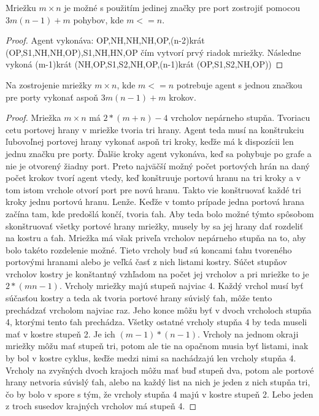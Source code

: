 \begin{lem}
Mriežku $m \times n$ je možné s použitím jedinej značky pre port zostrojiť
pomocou $3m(n - 1) + m$ pohybov, kde $m <= n$.
\end{lem}
\begin{proof}
Agent vykonáva: OP,NH,NH,NH,OP,(n-2)krát (OP,S1,NH,NH,OP),S1,NH,HN,OP čím
vytvorí prvý riadok mriežky. Následne vykoná
(m-1)krát (NH,OP,S1,S2,NH,OP,(n-1)krát (OP,S1,S2,NH,OP))
\end{proof}
\begin{lem}
Na zostrojenie mriežky $m \times n$, kde $m <=  n$ potrebuje agent s jednou
značkou pre porty vykonať aspoň $3m(n - 1) + m$ krokov.
\end{lem}
\begin{proof}
Mriežka $m \times n$ má $2*(m+n) - 4$ vrcholov nepárneho stupňa. Tvoriacu
cetu portovej hrany v mriežke tvoria tri hrany. Agent teda musí na
konštrukciu ľubovoľnej portovej hrany vykonať aspoň tri kroky, keďže má k
dispozícii len jednu značku pre porty.
Ďalšie kroky agent vykonáva, keď sa pohybuje po grafe a nie je otvorený
žiadny port. Preto najväčší možný počet portových hrán na daný počet krokov 
tvorí agent vtedy, keď konštruuje portovú hranu na tri kroky a v tom istom
vrchole otvorí port pre novú hranu. Takto vie konštruovať každé tri kroky
jednu portovú hranu. Lenže. Keďže v tomto prípade jedna portová hrana začína
tam, kde predošlá končí, tvoria ťah. Aby teda bolo možné týmto spôsobom
skonštruovať všetky portové hrany mriežky, musely by sa jej hrany dať 
rozdeliť na kostru a ťah. Mriežka má však priveľa vrcholov nepárneho stupňa
na to, aby bolo takéto rozdelenie možné.
Tieto vrcholy buď sú koncami ťahu tvoreného portovými hranami alebo je veľká
časť z nich 
listami kostry. Súčet stupňov vrcholov kostry je konštantný vzhľadom na
počet jej vrcholov a pri mriežke to je $2 * (mn - 1)$. Vrcholy mriežky majú
stupeň najviac 4. Každý vrchol musí byť súčasťou kostry a teda ak tvoria
portové hrany súvislý ťah, môže tento prechádzať vrcholom najviac raz. Jeho
konce môžu byť v dvoch vrcholoch stupňa 4, ktorými tento ťah prechádza.
Všetky ostatné vrcholy stupňa 4 by teda museli mať v kostre stupeň 2. Je ich $(m -
1) * (n -1)$. Vrcholy na jednom okraji mriežky môžu mať stupeň tri, potom
ale tie na opačnom musia byť listami, inak by bol v kostre cyklus, keďže
medzi nimi sa nachádzajú len vrcholy stupňa 4. Vrcholy na zvyšných dvoch
krajoch môžu mať buď stupeň dva, potom ale portové hrany netvoria súvislý
ťah, alebo na každý list na nich je jeden z nich stupňa tri, čo by bolo v
spore s tým, že vrcholy stupňa 4 majú v kostre stupeň 2. Lebo jeden z troch
susedov krajných vrcholov má stupeň 4.


\end{proof}
